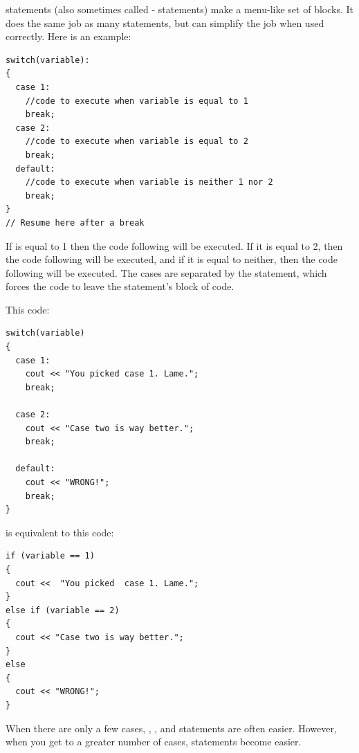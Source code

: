 
 statements (also sometimes called - statements) make a menu-like set of blocks. 
It does the same job as many  statements, but can simplify the job when used correctly. 
Here is an example:

\noindent\begin{minipage}{\linewidth}\begin{lstlisting}
switch(variable):
{
  case 1:
    //code to execute when variable is equal to 1
    break;
  case 2:
    //code to execute when variable is equal to 2
    break;
  default:
    //code to execute when variable is neither 1 nor 2
    break;
}
// Resume here after a break
\end{lstlisting}\end{minipage}

If  is equal to 1 then the code following  will be executed.
If it is equal to 2, then the code following  will be executed, and if it is equal to neither, then the code following  will be executed. 
The cases are separated by the  statement, which forces the code to leave the  statement's block of code.

This code: \nopagebreak[4]

\noindent\begin{minipage}{\linewidth}\begin{lstlisting}
switch(variable)
{
  case 1:
    cout << "You picked case 1. Lame.";
    break;

  case 2:
    cout << "Case two is way better.";
    break;

  default:
    cout << "WRONG!";
    break;
}
\end{lstlisting}\end{minipage}

\noindent is equivalent to this code: \nopagebreak[4]

\noindent\begin{minipage}{\linewidth}\begin{lstlisting}
if (variable == 1)
{
  cout <<  "You picked  case 1. Lame.";
}
else if (variable == 2)
{
  cout << "Case two is way better.";
}
else
{
  cout << "WRONG!";
}
\end{lstlisting}\end{minipage}

When there are only a few cases, , , and  statements are often easier. 
However, when you get to a greater number of cases,  statements become easier.

